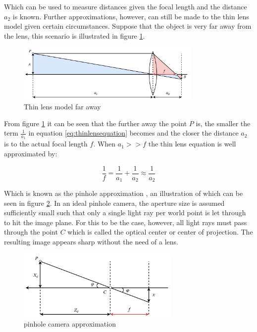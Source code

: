 Which can be used to measure distances given the focal length and the distance $a_{2}$ is known. Further approximations, however, can still be made to the thin lens model given certain circumstances. Suppose that the object is very far away from the lens, this scenario is illustrated in figure \ref{fig:thinlensmodel_far}. 

\begin{figure}[h]
    \centering
    \includegraphics[width=0.8\textwidth]{figures/reconstruction/thinlensmodel3.pdf}
    \caption{Thin lens model far away}
    \label{fig:thinlensmodel_far}
\end{figure}

From figure \ref{fig:thinlensmodel_far} it can be seen that the further away the point $P$ is, the smaller the term $\frac{1}{a_{1}}$ in equation \ref{eq:thinlensequation} becomes and the closer the distance $a_{2}$ is to the actual focal length $f$. When $a_{1} >> f$ the thin lens equation is well approximated by:

\begin{equation}
    \frac{1}{f} = \frac{1}{a_{1}} + \frac{1}{a_{2}} \approx \frac{1}{a_{2}}
\end{equation}

Which is known as the pinhole approximation \cite{imageformationDTU}, an illustration of which can be seen in figure \ref{fig:pinhole_model}. In an ideal pinhole camera, the aperture size is assumed sufficiently small such that only a single light ray per world point is let through to hit the image plane. For this to be the case, however, all light rays must pass through the point $C$ which is called the optical center or center of projection. The resulting image appears sharp without the need of a lens. 

\begin{figure}[h]
    \centering
    \includegraphics[width=0.7\textwidth]{figures/reconstruction/pinhole_approx.pdf}
    \caption{pinhole camera approximation}
    \label{fig:pinhole_model}
\end{figure}

